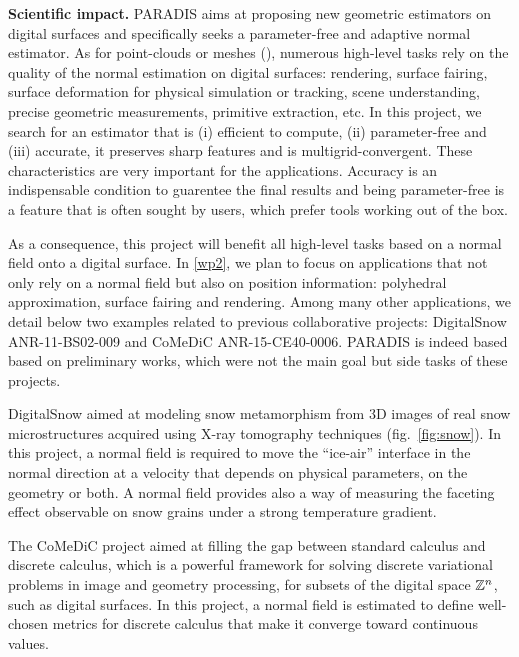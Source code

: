 \noindent\textbf{Scientific impact.}
PARADIS aims at proposing new geometric estimators on digital surfaces and
specifically seeks a parameter-free and adaptive normal estimator.
As for point-clouds or meshes (), numerous high-level tasks
rely on the quality of the normal estimation on digital surfaces: rendering,
surface fairing, surface deformation for physical simulation or tracking,
scene understanding, precise geometric measurements, primitive extraction, etc. 
In this project, we search for an estimator that is (i) efficient to compute,
(ii) parameter-free and (iii) accurate, \ie it preserves sharp features and
is multigrid-convergent. These characteristics are very important for the
applications. Accuracy is an indispensable condition to guarentee the final
results and being parameter-free is a feature that is often sought by users,
which prefer tools working out of the box.

As a consequence, this project will benefit all high-level tasks based on a
normal field onto a digital surface. In \ref{wp2}, we plan to focus on applications
that not only rely on a normal field but also on position information:
polyhedral approximation, surface fairing and rendering. Among many other
applications, we detail below two examples related to previous collaborative projects: 
DigitalSnow ANR-11-BS02-009 and CoMeDiC ANR-15-CE40-0006. PARADIS is indeed based
based on preliminary works, which were not the main goal but side tasks of these projects.

DigitalSnow aimed at modeling snow metamorphism from 3D images of real snow
microstructures acquired using X-ray tomography techniques (fig.~\ref{fig:snow}).
In this project, a normal field is required to move the ``ice-air'' interface
in the normal direction at a velocity that depends on physical parameters,
on the geometry or both. A normal field provides also a way of measuring 
the faceting effect observable on snow grains under a strong temperature gradient.  

The CoMeDiC project aimed at filling the gap between standard calculus and
discrete calculus, which is a powerful framework for solving discrete variational
problems in image and geometry processing, for subsets of the digital space ${\mathbb{Z}}^n$, 
such as digital surfaces. In this project, a normal field is estimated to define
well-chosen metrics for discrete calculus that make it converge toward continuous values.

